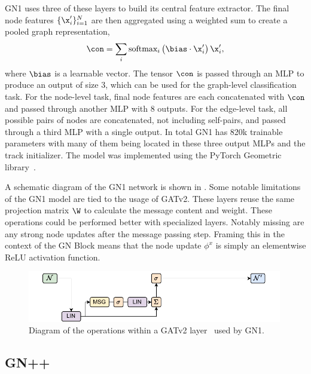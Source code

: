 GN1 uses three of these layers to build its central feature extractor.
The final node features $\{\x_i'\}_{i=1}^{N}$ are then aggregated using a weighted sum to create a pooled graph representation,
\begin{equation}
    \con = \sum_{i} \text{softmax}_i\left(\bias \cdot \x_i'\right) \x_i',
\end{equation}
where $\bias$ is a learnable vector.
The tensor $\con$ is passed through an MLP to produce an output of size 3, which can be used for the graph-level classification task.
For the node-level task, final node features are each concatenated with $\con$ and passed through another MLP with 8 outputs.
For the edge-level task, all possible pairs of nodes are concatenated, not including self-pairs, and passed through a third MLP with a single output.
In total GN1 has 820k trainable parameters with many of them being located in these three output MLPs and the track initializer.
The model was implemented using the PyTorch Geometric library~\cite{PYG}.

A schematic diagram of the GN1 network is shown in .
Some notable limitations of the GN1 model are tied to the usage of GATv2.
These layers reuse the same projection matrix $\W$ to calculate the message content and weight.
These operations could be performed better with specialized layers.
Notably missing are any strong node updates after the message passing step.
Framing this in the context of the GN Block means that the node update $\phi^x$ is simply an elementwise ReLU activation function.

\begin{figure}
    \centering
    \includegraphics[width=0.99\textwidth]{figures/flavour_tagging/gn1.pdf}
    \caption{Diagram of the operations within a GATv2 layer~\cite{GATv2} used by GN1.}
    \label{fig:gn1_graph}
\end{figure}

\subsection{GN++}
\label{sec:gnp}

